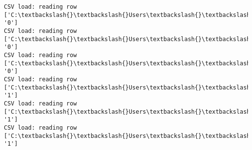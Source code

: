 \documentclass[11pt]{article}
\begin{document}
\begin{Verbatim}[commandchars=\\\{\}]
CSV load: reading row ['C:\textbackslash{}\textbackslash{}Users\textbackslash{}\textbackslash{}AbhishekGangadhar\textbackslash{}\textbackslash{}Downloads\textbackslash{}\textbackslash{}ActionRecog\textbackslash{}\textbackslash{}ActionRecog\textbackslash{}\textbackslash{}DataSets\textbackslash{}\textbackslash{}UCF11\textbackslash{}\textbackslash{}action\_youtube\_naudio\textbackslash{}\textbackslash{}biking\textbackslash{}\textbackslash{}v\_biking\_25\textbackslash{}\textbackslash{}v\_biking\_25\_02.avi', '0']
CSV load: reading row ['C:\textbackslash{}\textbackslash{}Users\textbackslash{}\textbackslash{}AbhishekGangadhar\textbackslash{}\textbackslash{}Downloads\textbackslash{}\textbackslash{}ActionRecog\textbackslash{}\textbackslash{}ActionRecog\textbackslash{}\textbackslash{}DataSets\textbackslash{}\textbackslash{}UCF11\textbackslash{}\textbackslash{}action\_youtube\_naudio\textbackslash{}\textbackslash{}biking\textbackslash{}\textbackslash{}v\_biking\_25\textbackslash{}\textbackslash{}v\_biking\_25\_03.avi', '0']
CSV load: reading row ['C:\textbackslash{}\textbackslash{}Users\textbackslash{}\textbackslash{}AbhishekGangadhar\textbackslash{}\textbackslash{}Downloads\textbackslash{}\textbackslash{}ActionRecog\textbackslash{}\textbackslash{}ActionRecog\textbackslash{}\textbackslash{}DataSets\textbackslash{}\textbackslash{}UCF11\textbackslash{}\textbackslash{}action\_youtube\_naudio\textbackslash{}\textbackslash{}biking\textbackslash{}\textbackslash{}v\_biking\_25\textbackslash{}\textbackslash{}v\_biking\_25\_04.avi', '0']
CSV load: reading row ['C:\textbackslash{}\textbackslash{}Users\textbackslash{}\textbackslash{}AbhishekGangadhar\textbackslash{}\textbackslash{}Downloads\textbackslash{}\textbackslash{}ActionRecog\textbackslash{}\textbackslash{}ActionRecog\textbackslash{}\textbackslash{}DataSets\textbackslash{}\textbackslash{}UCF11\textbackslash{}\textbackslash{}action\_youtube\_naudio\textbackslash{}\textbackslash{}golf\_swing\textbackslash{}\textbackslash{}v\_golf\_22\textbackslash{}\textbackslash{}v\_golf\_22\_01.avi', '1']
CSV load: reading row ['C:\textbackslash{}\textbackslash{}Users\textbackslash{}\textbackslash{}AbhishekGangadhar\textbackslash{}\textbackslash{}Downloads\textbackslash{}\textbackslash{}ActionRecog\textbackslash{}\textbackslash{}ActionRecog\textbackslash{}\textbackslash{}DataSets\textbackslash{}\textbackslash{}UCF11\textbackslash{}\textbackslash{}action\_youtube\_naudio\textbackslash{}\textbackslash{}golf\_swing\textbackslash{}\textbackslash{}v\_golf\_22\textbackslash{}\textbackslash{}v\_golf\_22\_02.avi', '1']
CSV load: reading row ['C:\textbackslash{}\textbackslash{}Users\textbackslash{}\textbackslash{}AbhishekGangadhar\textbackslash{}\textbackslash{}Downloads\textbackslash{}\textbackslash{}ActionRecog\textbackslash{}\textbackslash{}ActionRecog\textbackslash{}\textbackslash{}DataSets\textbackslash{}\textbackslash{}UCF11\textbackslash{}\textbackslash{}action\_youtube\_naudio\textbackslash{}\textbackslash{}golf\_swing\textbackslash{}\textbackslash{}v\_golf\_22\textbackslash{}\textbackslash{}v\_golf\_22\_03.avi', '1']

\end{Verbatim}
\end{document}
